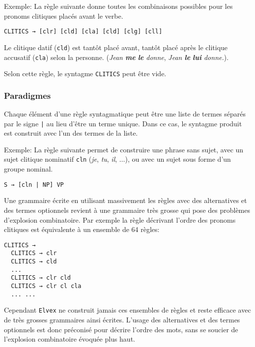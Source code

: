 \documentclass[11pt]{article}
\begin{document}
Exemple:
La règle suivante donne toutes les combinaisons possibles pour les
pronoms clitiques placés avant le verbe.

\begin{lstlisting}[numbers=none]
  CLITICS → [clr] [cld] [cla] [cld] [clg] [cll] 
\end{lstlisting}

Le clitique datif (\texttt{cld}) est tantôt placé avant, tantôt
placé après le clitique accusatif (\texttt{cla}) selon la
personne. (\textit{Jean \textbf{me} \textbf{le} donne}, \textit{Jean
  \textbf{le} \textbf{lui} donne.}).

Selon cette règle, le syntagme \texttt{CLITICS} peut être vide.

\subsubsection*{Paradigmes}

Chaque élément d'une règle syntagmatique peut être une liste de termes
séparés par le signe \verb#|# au lieu d'être un terme unique. Dans ce
cas, le syntagme produit est construit avec l'un des termes de la liste.

Exemple:
La règle suivante permet de construire une phrase sans sujet, avec un
sujet clitique nominatif \texttt{cln} (\textit{je}, \textit{tu},
\textit{il}, $\dots$), ou avec un sujet sous forme d'un groupe nominal.

\begin{lstlisting}[numbers=none]
S → [cln | NP] VP
\end{lstlisting}

Une grammaire écrite en utilisant massivement les règles avec des
alternatives et des termes optionnels revient à une grammaire très
grosse qui pose des problèmes d'explosion combinatoire. Par exemple la
règle décrivant l'ordre des pronoms clitiques est équivalente à un
ensemble de 64 règles:
 
\begin{lstlisting}[numbers=none]
  CLITICS → 
  CLITICS → clr 
  CLITICS → cld 
  ...
  CLITICS → clr cld 
  CLITICS → clr cl cla
  ... ...
\end{lstlisting}

Cependant \texttt{Elvex} ne construit jamais ces ensembles de règles
et reste efficace avec de très grosses grammaires ainsi
écrites. L'usage des alternatives et des termes optionnels est donc
préconisé pour décrire l'ordre des mots, sans se soucier de
l'explosion combinatoire évoquée plus haut.
\end{document}
